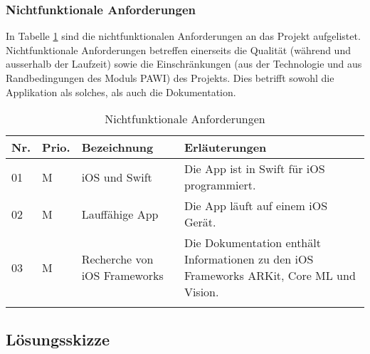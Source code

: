 \subsubsection{Nichtfunktionale Anforderungen}
In Tabelle \ref{tab:nichtfunktionale-anforderungen} sind die nichtfunktionalen Anforderungen an das Projekt aufgelistet. Nichtfunktionale Anforderungen betreffen einerseits die Qualität (während und ausserhalb der Laufzeit) sowie die Einschränkungen (aus der Technologie und aus Randbedingungen des Moduls PAWI) des Projekts. Dies betrifft sowohl die Applikation als solches, als auch die Dokumentation.

\begin{longtable}{l l p{4.7cm} p{8cm}}
	\hline
	\textbf{Nr.} & \textbf{Prio.} & \textbf{Bezeichnung} & \textbf{Erläuterungen} \\
	\hline
	01 & M & iOS und Swift & Die App ist in Swift für iOS programmiert. \\
	02 & M & Lauffähige App & Die App läuft auf einem iOS Gerät. \\
	03 & M & Recherche von iOS Frameworks & Die Dokumentation enthält Informationen zu den iOS Frameworks ARKit, Core ML und Vision. \\
	\hline
	\caption{Nichtfunktionale Anforderungen}
	\label{tab:nichtfunktionale-anforderungen}
\end{longtable}

\subsection{Lösungsskizze}

